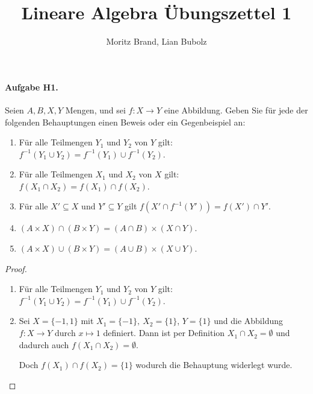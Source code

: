 \documentclass[12pt, letterpaper]{article}
\title{Lineare Algebra Übungszettel 1}
\author{Moritz Brand, Lian Bubolz}
\date{}
\begin{document}
\maketitle
\paragraph{Aufgabe H1.}

Seien $A, B, X, Y$ Mengen, und sei $f : X \to  Y$ eine Abbildung. 
Geben Sie für jede der folgenden Behauptungen einen Beweis oder ein Gegenbeispiel an:

\begin{enumerate}

    \item Für alle Teilmengen $Y_1$ und $Y_2$ von $Y$ gilt: 
        $f^{-1}(Y_1 \cup Y_2) = f^{-1}(Y_1) \cup f^{-1}(Y_2)$.

    \item Für alle Teilmengen $X_1$ und $X_2$ von $X$ gilt: 
        $f(X_1 \cap X_2) = f(X_1) \cap  f(X_2)$.

    \item Für alle $X'\subseteq X$ und $Y'\subseteq Y$ gilt $f(X' \cap f^{-1}(Y')) = f(X') \cap Y'$.
    \item $(A \times X) \cap (B \times Y) = (A \cap B) \times (X \cap Y)$. 
    \item $(A \times X) \cup (B \times Y) = (A \cup B) \times (X \cup Y)$. 

\end{enumerate} 
 
\begin{proof}
    \hspace*{10mm} \par

    \begin{enumerate}

        

        \item Für alle Teilmengen $Y_1$ und $Y_2$ von $Y$ gilt: 
            $f^{-1}(Y_1 \cup Y_2) = f^{-1}(Y_1) \cup f^{-1}(Y_2)$.

        \item Sei $X = \{-1,1\}$ mit $X_1 = \{-1\}, \ X_2=\{1\}$, $Y = \{1\}$ und die Abbildung $f : X \to  Y$ durch $x\mapsto 1$ definiert.
        Dann ist per Definition $X_1 \cap X_2 = \emptyset$ und dadurch auch $f(X_1 \cap X_2) = \emptyset$. 
        
        Doch $f(X_1) \cap  f(X_2) = \{1\}$ wodurch die Behauptung widerlegt wurde.
    \end{enumerate} 

\end{proof} 
\end{document}
